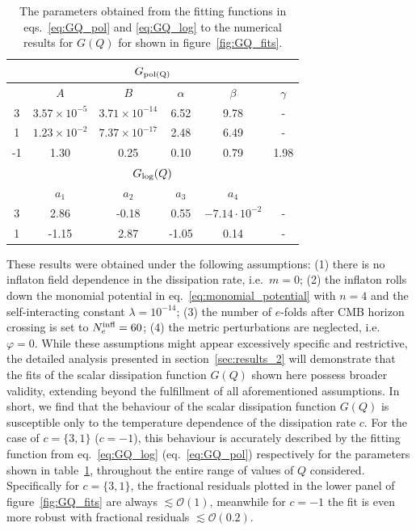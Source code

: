 \documentclass[a4paper,11pt]{article}
\begin{document}
\begin{table}[ht!]
	\centering
	\begin{tabular}{c|ccccc}
		\toprule
		\hline 
		\multicolumn{6}{c}{$G_{\rm{pol}(Q)}$ }\\
		\hline \diagbox[width=15em]{Value of $c$}{Fit parameters} & $A$ & $B$ & $\alpha$ & $\beta$ &  $\gamma$ \\
		\hline
		3 & $3.57\times10^{-5}$ & $3.71\times10^{-14}$ & 6.52 & 9.78 & - \\
		1 & $1.23\times10^{-2}$ & $7.37\times10^{-17}$ & 2.48 & 6.49 & - \\
		-1 & 1.30 & 0.25 & 0.10 & 0.79 & 1.98 \\
		\hline
		\multicolumn{6}{c}{$G_{\rm{log}}(Q)$}\\
  \hline
  & $a_1$ & $a_2$ & $a_3$ & $a_4$ & \\
		 \hline
		3 & 2.86 & -0.18 & 0.55 & $-7.14\cdot 10^{-2}$ & - \\
		1 & -1.15 & 2.87 & -1.05 & 0.14 & - \\		
		\hline
		\bottomrule
	\end{tabular}
	\caption{The parameters obtained from the fitting functions in eqs.~\eqref{eq:GQ_pol} and \eqref{eq:GQ_log} to the numerical results for $G(Q)$ for shown in figure~\ref{fig:GQ_fits}.}
	\label{tab:1}
\end{table}
These results were obtained under the following assumptions: (1) there is no inflaton field dependence in the dissipation rate, i.e.\ $m=0$; (2) the inflaton rolls down the monomial potential in eq.~\eqref{eq:monomial_potential} with $n=4$ and the self-interacting constant $\lambda=10^{-14}$; (3) the number of $e$-folds after CMB horizon crossing is set to  $N_e^{\rm{infl}}=60$; (4) the metric perturbations are neglected, i.e.\ $\varphi=0$. 
While these assumptions might appear excessively specific and restrictive, the detailed analysis presented in section~\ref{sec:results_2} will demonstrate that the fits of the scalar dissipation function $G(Q)$ shown here possess broader validity, extending beyond the fulfillment of all aforementioned assumptions. In short, we find that the behaviour of the scalar dissipation function $G(Q)$ is susceptible only to the temperature dependence of the dissipation rate $c$. For the case of $c=\{3,1\}$ ($c=-1$), this behaviour is accurately described by the fitting function from eq.~\eqref{eq:GQ_log} (eq.~\eqref{eq:GQ_pol}) respectively for the parameters shown in table~\ref{tab:1}, throughout the entire range of values of $Q$ considered. Specifically for $c=\{3,1\}$, the fractional residuals plotted in the lower panel of figure~\ref{fig:GQ_fits} are always $\lesssim\mathcal{O}(1)$, meanwhile for $c=-1$ the fit is even more robust with fractional residuals $\lesssim \mathcal{O}(0.2)$.
\end{document}
